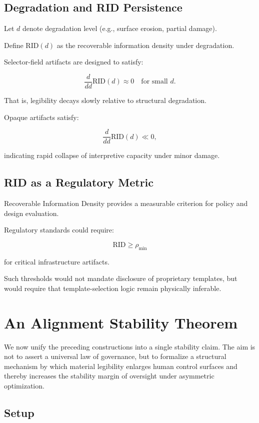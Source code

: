 \documentclass[11pt]{article}
\begin{document}
\subsection{Degradation and RID Persistence}

Let $d$ denote degradation level (e.g., surface erosion, partial damage).

Define $\text{RID}(d)$ as the recoverable information density 
under degradation.

Selector-field artifacts are designed to satisfy:

\[
\frac{d}{dd} \text{RID}(d) \approx 0 \quad \text{for small } d.
\]

That is, legibility decays slowly relative to structural degradation.

Opaque artifacts satisfy:

\[
\frac{d}{dd} \text{RID}(d) \ll 0,
\]

indicating rapid collapse of interpretive capacity under minor damage.

\subsection{RID as a Regulatory Metric}

Recoverable Information Density provides a measurable criterion 
for policy and design evaluation.

Regulatory standards could require:

\[
\text{RID} \geq \rho_{\text{min}}
\]

for critical infrastructure artifacts.

Such thresholds would not mandate disclosure of proprietary 
templates, but would require that template-selection logic 
remain physically inferable.

\section{An Alignment Stability Theorem}

We now unify the preceding constructions into a single stability claim.
The aim is not to assert a universal law of governance, but to formalize
a structural mechanism by which material legibility enlarges human
control surfaces and thereby increases the stability margin of oversight
under asymmetric optimization.

\subsection{Setup}
\end{document}
